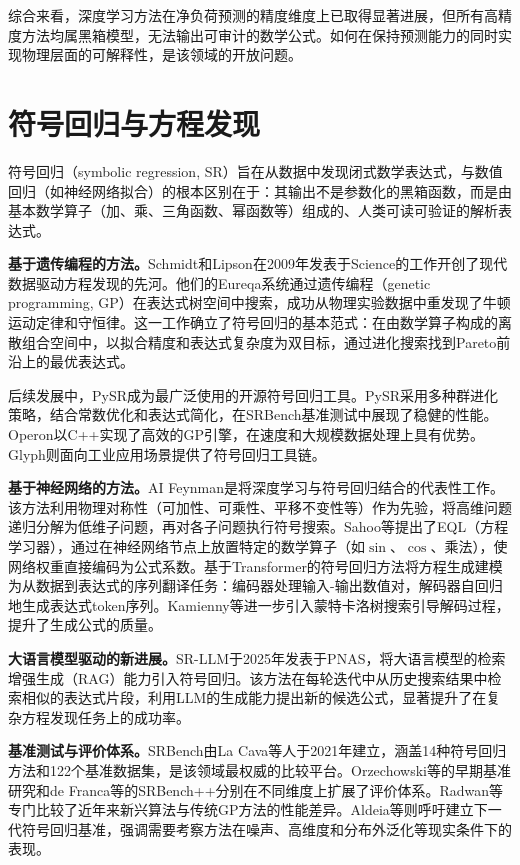 综合来看，深度学习方法在净负荷预测的精度维度上已取得显著进展，但所有高精度方法均属黑箱模型，无法输出可审计的数学公式。如何在保持预测能力的同时实现物理层面的可解释性，是该领域的开放问题。

\section{符号回归与方程发现}

符号回归（symbolic regression, SR）旨在从数据中发现闭式数学表达式，与数值回归（如神经网络拟合）的根本区别在于：其输出不是参数化的黑箱函数，而是由基本数学算子（加、乘、三角函数、幂函数等）组成的、人类可读可验证的解析表达式。

\textbf{基于遗传编程的方法。}Schmidt和Lipson\cite{schmidt2009distilling}在2009年发表于Science的工作开创了现代数据驱动方程发现的先河。他们的Eureqa系统通过遗传编程（genetic programming, GP）在表达式树空间中搜索，成功从物理实验数据中重发现了牛顿运动定律和守恒律。这一工作确立了符号回归的基本范式：在由数学算子构成的离散组合空间中，以拟合精度和表达式复杂度为双目标，通过进化搜索找到Pareto前沿上的最优表达式。

后续发展中，PySR\cite{cranmer2023pysr}成为最广泛使用的开源符号回归工具。PySR采用多种群进化策略，结合常数优化和表达式简化，在SRBench基准测试\cite{lacava2021srbench}中展现了稳健的性能。Operon\cite{burlacu2020operon}以C++实现了高效的GP引擎，在速度和大规模数据处理上具有优势。Glyph\cite{balandat2020glyph}则面向工业应用场景提供了符号回归工具链。

\textbf{基于神经网络的方法。}AI Feynman\cite{udrescu2020ai}是将深度学习与符号回归结合的代表性工作。该方法利用物理对称性（可加性、可乘性、平移不变性等）作为先验，将高维问题递归分解为低维子问题，再对各子问题执行符号搜索。Sahoo等\cite{sahoo2018learning}提出了EQL（方程学习器），通过在神经网络节点上放置特定的数学算子（如$\sin$、$\cos$、乘法），使网络权重直接编码为公式系数。基于Transformer的符号回归方法\cite{biggio2021neural,kamienny2022end}将方程生成建模为从数据到表达式的序列翻译任务：编码器处理输入-输出数值对，解码器自回归地生成表达式token序列。Kamienny等\cite{kamienny2022end}进一步引入蒙特卡洛树搜索引导解码过程，提升了生成公式的质量。

\textbf{大语言模型驱动的新进展。}SR-LLM\cite{shojaee2025sr}于2025年发表于PNAS，将大语言模型的检索增强生成（RAG）能力引入符号回归。该方法在每轮迭代中从历史搜索结果中检索相似的表达式片段，利用LLM的生成能力提出新的候选公式，显著提升了在复杂方程发现任务上的成功率。

\textbf{基准测试与评价体系。}SRBench\cite{lacava2021srbench}由La Cava等人于2021年建立，涵盖14种符号回归方法和122个基准数据集，是该领域最权威的比较平台。Orzechowski等\cite{orzechowski2018where}的早期基准研究和de Franca等\cite{defranca2023srbench}的SRBench++分别在不同维度上扩展了评价体系。Radwan等\cite{radwan2024comparison}专门比较了近年来新兴算法与传统GP方法的性能差异。Aldeia等\cite{aldeia2024srbench}则呼吁建立下一代符号回归基准，强调需要考察方法在噪声、高维度和分布外泛化等现实条件下的表现。

